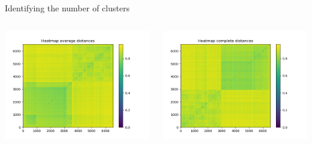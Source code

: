 \documentclass[shortpres]{beamer}
\begin{document}
\begin{frame}{Identifying the number of clusters}
    \begin{columns}
        \begin{column}{0.5\textwidth}
            \includegraphics[width=\textwidth]{heatmap_average.png}
        \end{column}
        \begin{column}{0.5\textwidth}
            \includegraphics[width=\textwidth]{heatmap_complete.png}
        \end{column}
    \end{columns}
\end{frame}
\end{document}
